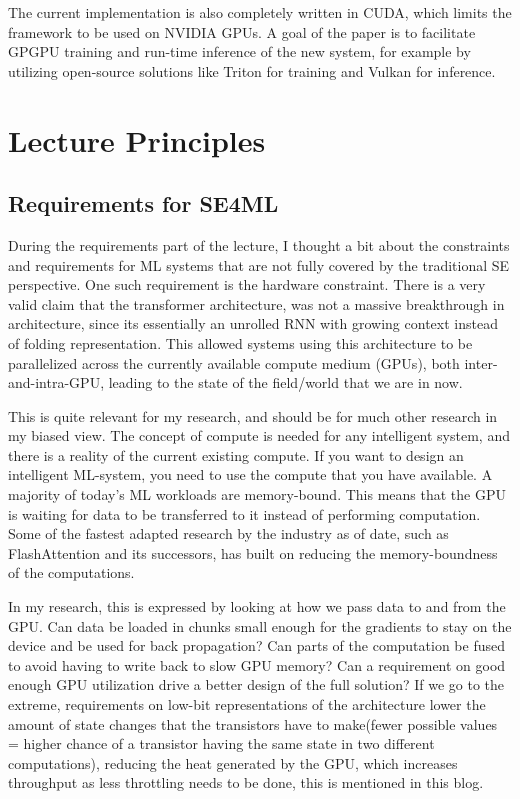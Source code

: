 \documentclass[a4paper, 11pt]{article} %
\begin{document}
The current implementation is also completely written in CUDA\cite{cuda}, which limits the framework to be used on NVIDIA GPUs. A goal of the paper is to facilitate GPGPU training and
run-time inference of the new system, for example by utilizing open-source solutions like Triton\cite{triton} for training and Vulkan\cite{vulkan} for inference.

\section{Lecture Principles}

\subsection{Requirements for SE4ML}
During the requirements part of the lecture, I thought a bit about the constraints and requirements for ML systems that are not fully covered by the traditional SE perspective.
One such requirement is the hardware constraint. There is a very valid claim that the transformer architecture\cite{transformers}, was not a massive breakthrough in architecture,
since its essentially an unrolled RNN with growing context instead of folding representation. This allowed systems using this architecture to be parallelized across the currently 
available compute medium (GPUs), both inter-and-intra-GPU, leading to the state of the field/world that we are in now.

This is quite relevant for my research, and should be for much other research in my biased view. The concept of compute is needed for any intelligent system, and there is a reality
of the current existing compute. If you want to design an intelligent ML-system, you need to use the compute that you have available.
A majority of today's ML workloads are memory-bound. This means that the GPU is waiting for data to be transferred to it instead of performing computation.
Some of the fastest adapted research by the industry as of date, such as FlashAttention\cite{flashattention} and its successors, has built on reducing the memory-boundness of 
the computations.

In my research, this is expressed by looking at how we pass data to and from the GPU. Can data be loaded in chunks small enough for the gradients to stay on the device and 
be used for back propagation? Can parts of the computation be fused to avoid having to write back to slow GPU memory? Can a requirement on good enough GPU utilization drive
a better design of the full solution? If we go to the extreme, requirements on low-bit representations of the architecture lower the amount of state changes that the transistors
have to make(fewer possible values = higher chance of a transistor having the same state in two different computations), reducing the heat generated by the GPU, which increases throughput as less throttling needs to be done, this is mentioned in this blog\cite{wattblog}.
\end{document}
